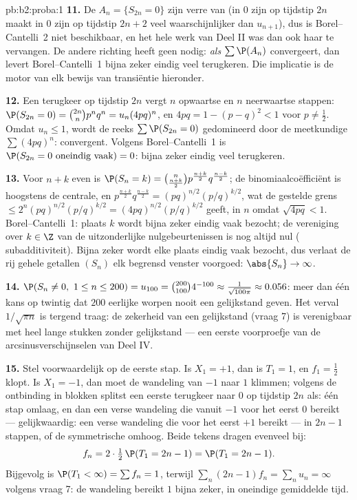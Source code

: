 \begin{solution}{pb:b2:proba:1}
\textbf{11.} De  $A_n = \{S_{2n} = 0\}$ zijn verre
van  (in $0$ zijn op tijdstip $2n$ maakt in $0$ zijn
op tijdstip $2n + 2$ veel waarschijnlijker dan $u_{n+1}$), dus is
Borel--Cantelli~2 niet beschikbaar, en het hele werk van Deel II
was dan ook haar te vervangen. De andere richting heeft geen
 nodig: \emph{als} $\sum\P(A_n)$ convergeert, dan
levert Borel--Cantelli~1 bijna zeker eindig veel terugkeren. Die
implicatie is de motor van elk bewijs van transiëntie hieronder.

\textbf{12.} Een terugkeer op tijdstip $2n$ vergt $n$ opwaartse en
$n$ neerwaartse stappen: $\P(S_{2n} = 0) = \binom{2n}np^nq^n =
u_n(4pq)^n$, en $4pq = 1 - (p - q)^2 < 1$ voor $p \neq \frac12$.
Omdat $u_n \leq 1$, wordt de reeks $\sum\P(S_{2n} = 0)$ gedomineerd
door de meetkundige $\sum(4pq)^n$: convergent. Volgens
Borel--Cantelli~1 is $\P(S_{2n} = 0 \text{ oneindig vaak}) = 0$:
bijna zeker eindig veel terugkeren.

\textbf{13.} Voor $n + k$ even is $\P(S_n = k) =
\binom{n}{\frac{n+k}2}p^{\frac{n+k}2}q^{\frac{n-k}2}$; de
binomiaalcoëfficiënt is hoogstens de centrale, en
$p^{\frac{n+k}2}q^{\frac{n-k}2} = (pq)^{n/2}(p/q)^{k/2}$, wat de
gestelde grens $\leq 2^n(pq)^{n/2}(p/q)^{k/2} =
(4pq)^{n/2}(p/q)^{k/2}$ geeft,  in $n$ omdat
$\sqrt{4pq} < 1$. Borel--Cantelli~1: plaats $k$ wordt bijna zeker
eindig vaak bezocht; de vereniging over $k \in \Z$ van de
uitzonderlijke nulgebeurtenissen is nog altijd nul (
subadditiviteit). Bijna zeker wordt elke plaats eindig vaak
bezocht, dus verlaat de rij gehele getallen $(S_n)$ elk begrensd
venster voorgoed: $\abs{S_n} \to \infty$.

\textbf{14.} $\P(S_n \neq 0,\ 1 \leq n \leq 200) = u_{100} =
\binom{200}{100}4^{-100} \approx \frac1{\sqrt{100\pi}} \approx
0.056$: meer dan één kans op twintig dat $200$ eerlijke worpen
nooit een gelijkstand geven. Het verval $1/\sqrt{\pi n}$ is
tergend traag: de zekerheid van een gelijkstand (vraag 7) is
verenigbaar met heel lange stukken zonder gelijkstand --- een
eerste voorproefje van de arcsinusverschijnselen van Deel IV.

\textbf{15.} Stel voorwaardelijk op de eerste stap. Is $X_1 = +1$,
dan is $T_1 = 1$, en $f_1 = \frac12$ klopt. Is $X_1 = -1$, dan moet
de wandeling van $-1$ naar $1$ klimmen; volgens de ontbinding in
blokken splitst een eerste terugkeer naar $0$ op tijdstip $2n$ als:
één stap omlaag, en dan een verse wandeling die vanuit $-1$ voor
het eerst $0$ bereikt --- gelijkwaardig: een verse wandeling die
voor het eerst $+1$ bereikt --- in $2n - 1$ stappen, of de
symmetrische  omhoog. Beide tekens dragen evenveel bij:
\[
f_n = 2\cdot\tfrac12\,\P(T_1 = 2n - 1) = \P(T_1 = 2n-1) .
\]
Bijgevolg is $\P(T_1 < \infty) = \sum f_n = 1$, terwijl $\sum_n(2n
- 1)f_n = \sum_n u_n = \infty$ volgens vraag 7: de wandeling
bereikt $1$ bijna zeker, in oneindige gemiddelde tijd.


\end{solution}
